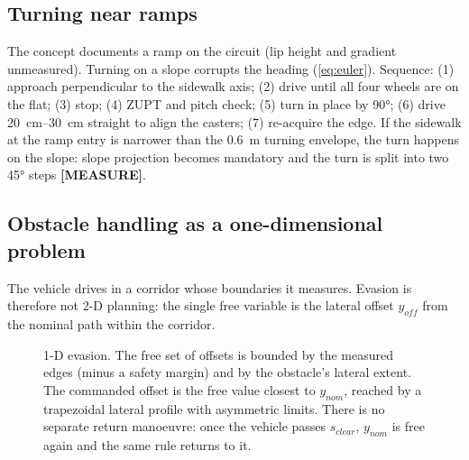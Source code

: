\documentclass[11pt,a4paper]{article}
\newcommand{\mk}[2]{\textsf{\scriptsize\bfseries\colorbox{#1bg}{\color{#1}[#2]}}}
\newcommand{\MEASURE}{\mk{warn}{MEASURE}}
\begin{document}
\subsection{Turning near ramps}

The concept documents a ramp on the circuit (lip height and gradient
unmeasured). Turning on a slope corrupts the heading (\cref{eq:euler}). Sequence:
(1) approach perpendicular to the sidewalk axis; (2) drive until all four wheels
are on the flat; (3) stop; (4) ZUPT and pitch check; (5) turn in place by
\ang{90}; (6) drive \qtyrange{20}{30}{cm} straight to align the casters;
(7) re-acquire the edge. If the sidewalk at the ramp entry is narrower than the
\qty{0.6}{m} turning envelope, the turn happens on the slope: slope projection
becomes mandatory and the turn is split into two \ang{45} steps \MEASURE.

\subsection{Obstacle handling as a one-dimensional problem}\label{sec:evasion}

The vehicle drives in a corridor whose boundaries it measures. Evasion is
therefore not 2-D planning: the single free variable is the lateral offset
$y_{off}$ from the nominal path within the corridor.

\begin{figure}[htbp]
\centering
{}
\caption{1-D evasion. The free set of offsets is bounded by the measured edges
(minus a safety margin) and by the obstacle's lateral extent. The commanded
offset is the free value closest to $y_{nom}$, reached by a trapezoidal lateral
profile with asymmetric limits. There is no separate return manoeuvre: once the
vehicle passes $s_{clear}$, $y_{nom}$ is free again and the same rule returns to
it.}
\label{fig:evasion}
\end{figure}
\end{document}
